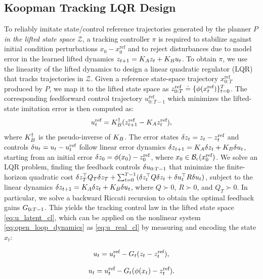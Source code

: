 \subsection{Koopman Tracking LQR Design}
\label{sec:controller_design}
To reliably imitate state/control reference trajectories generated by the planner $P$ \textit{in the lifted state space} $\mathcal{Z}$, a tracking controller $\pi$ is required to stabilize against initial condition perturbations $x_0 - x_0^\textrm{ref}$ and to reject disturbances due to model error in the learned lifted dynamics $z_{t+1} = K_{A} z_t + K_{B} u_t$. To obtain $\pi$, we use the linearity of the lifted dynamics to design a linear quadratic regulator (LQR) that tracks trajectories in $\mathcal{Z}$. Given a reference state-space trajectory $x_{0:T}^{\text{ref}}$ produced by $P$, we map it to the lifted state space as $z_{0:T}^{\text{ref}} \doteq \{\phi(x_t^{\text{ref}})\}_{t=0}^T$. The corresponding feedforward control trajectory $u_{0:T-1}^{\text{ref}}$ which minimizes the lifted-state imitation error is then computed as:
\begin{equation}
\label{eq:u_ff}
u_{t}^{\text{ref}} = K_{B}^{\dagger} (z_{t+1}^{\text{ref}} - K_{A} z_{t}^{\text{ref}}),
\end{equation}
where $K_{B}^{\dagger}$ is the pseudo-inverse of $K_{B}$. The error states $\delta z_{t} = z_{t} - z^{\text{ref}}_{t}$ and controls $\delta u_{t} = u_{t} - u^{\text{ref}}_{t}$ follow linear error dynamics $\delta z_{t+1} = K_{A} \delta z_{t} + K_{B} \delta u_{t}$, starting from an initial error $\delta z_0 = \phi(x_0) - z^{\text{ref}}_0$, where $x_0 \in \mathcal{B}_{\epsilon}(x_{0}^{\text{ref}})$. 
We solve an LQR problem, finding the feedback controls $\delta u_{0:T-1}$ that minimize the finite-horizon quadratic cost $\delta z_T^\top Q_T \delta z_T + \sum_{t=0}^{T-1} (\delta z_t^\top Q \delta z_t + \delta u_t^\top R \delta u_t)$, subject to the linear dynamics $\delta z_{t+1} = K_{A} \delta z_t + K_{B} \delta u_t$, where $Q \succ 0$, $R \succ 0$, and $Q_T \succ 0$. In particular, we solve a backward Riccati recursion to obtain the optimal feedback gains $G_{0:T-1}$. This yields the tracking control law in the lifted state space \eqref{eq:u_latent_cl}, which can be applied on the nonlinear system \eqref{eq:open_loop_dynamics} as \eqref{eq:u_real_cl} by measuring and encoding the state $x_t$:%

\begin{minipage}{0.48\textwidth}
\begin{equation}
\label{eq:u_latent_cl}
u_t = u^{\text{ref}}_t - G_t (z_t - z^{\text{ref}}_t),
\end{equation}
\end{minipage}
\hfill
\begin{minipage}{0.48\textwidth}
\begin{equation}
\label{eq:u_real_cl}
u_t = u^{\text{ref}}_t - G_t (\phi(x_t) - z^{\text{ref}}_t).
\end{equation}
\end{minipage}
